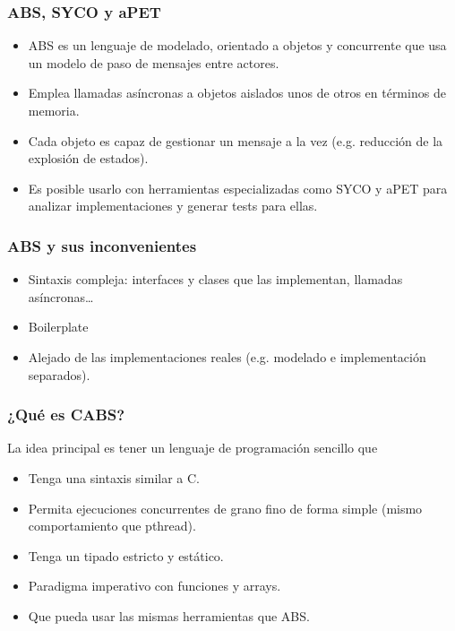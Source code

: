 \documentclass[spanish, a4paper, 12pt, final, slideColor, nototal, colorBG, pdf, noaccumulate, darkblue] {beamer}
\begin{document}
\begin{frame}
  \frametitle{ABS, SYCO y aPET}
  \begin{itemize}
    \item ABS es un lenguaje de modelado, orientado a objetos y concurrente que usa un modelo de paso de mensajes entre actores.
    \item Emplea llamadas asíncronas a objetos aislados unos de otros en términos de memoria.
    \item Cada objeto es capaz de gestionar un mensaje a la vez (e.g. reducción de la explosión de estados).
    \item Es posible usarlo con herramientas especializadas como SYCO y aPET para analizar implementaciones y generar tests para ellas.
  \end{itemize}
\end{frame}
\begin{frame}
  \frametitle{ABS y sus inconvenientes}
  \begin{itemize}
    \item Sintaxis compleja: interfaces y clases que las implementan, llamadas asíncronas\dots
    \item Boilerplate
    \item Alejado de las implementaciones reales (e.g. modelado e implementación separados).
  \end{itemize}
\end{frame}
\begin{frame}
  \frametitle{¿Qué es CABS?}
  La idea principal es tener un lenguaje de programación sencillo que
  \begin{itemize}
    \item Tenga una sintaxis similar a C.
    \item Permita ejecuciones concurrentes de grano fino de forma simple (mismo comportamiento que pthread).
    \item Tenga un tipado estricto y estático.
    \item Paradigma imperativo con funciones y arrays.
    \item Que pueda usar las mismas herramientas que ABS.
  \end{itemize}
\end{frame}
\end{document}
